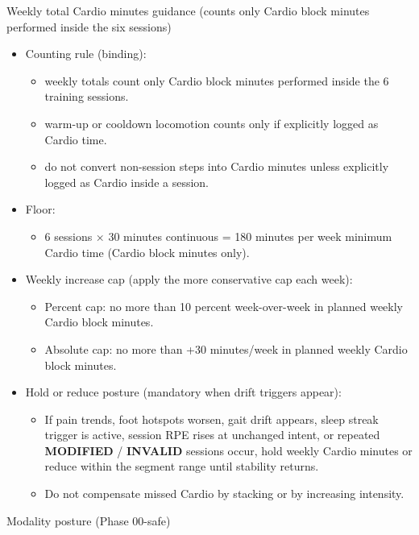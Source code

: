 \documentclass[10pt]{article}
\begin{document}
Weekly total Cardio minutes guidance (counts only Cardio block minutes performed inside the six sessions)

\begin{itemize}
\item Counting rule (binding):
  \begin{itemize}
  \item weekly totals count only Cardio block minutes performed inside the 6 training sessions.
  \item warm-up or cooldown locomotion counts only if explicitly logged as Cardio time.
  \item do not convert non-session steps into Cardio minutes unless explicitly logged as Cardio inside a session.
  \end{itemize}
\item Floor:
  \begin{itemize}
  \item 6 sessions × 30 minutes continuous = 180 minutes per week minimum Cardio time (Cardio block minutes only).
  \end{itemize}
\item Weekly increase cap (apply the more conservative cap each week):
  \begin{itemize}
  \item Percent cap: no more than 10 percent week-over-week in planned weekly Cardio block minutes.
  \item Absolute cap: no more than +30 minutes/week in planned weekly Cardio block minutes.
  \end{itemize}
\item Hold or reduce posture (mandatory when drift triggers appear):
  \begin{itemize}
  \item If pain trends, foot hotspots worsen, gait drift appears, sleep streak trigger is active, session RPE rises at unchanged intent, or repeated \textbf{MODIFIED} / \textbf{INVALID} sessions occur, hold weekly Cardio minutes or reduce within the segment range until stability returns.
  \item Do not compensate missed Cardio by stacking or by increasing intensity.
  \end{itemize}
\end{itemize}

Modality posture (Phase 00-safe)
\end{document}
